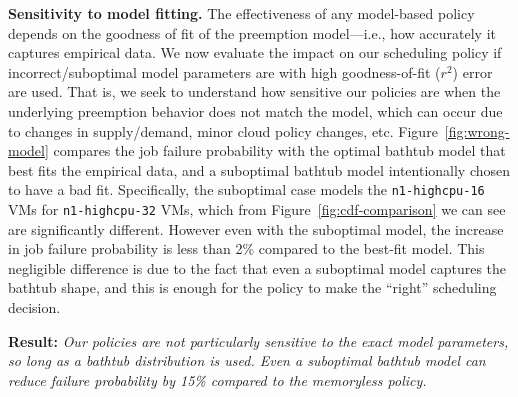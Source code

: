 



\noindent \textbf{Sensitivity to model fitting.}
The effectiveness of any model-based policy depends on the goodness of fit of the preemption model---i.e., how accurately it captures empirical data. 
%
We now evaluate the impact on our scheduling policy if incorrect/suboptimal model parameters are with high goodness-of-fit ($r^2$) error are used. 
%
That is, we seek to understand how sensitive our policies are when the underlying preemption behavior does not match the model, which can occur due to changes in supply/demand, minor cloud policy changes, etc. 
%
Figure~\ref{fig:wrong-model} compares the job failure probability with the optimal bathtub model that best fits the empirical data, and a suboptimal  bathtub model intentionally chosen to have a bad fit. 
%
Specifically, the suboptimal case models the \texttt{n1-highcpu-16} VMs for \texttt{n1-highcpu-32} VMs, which from Figure~\ref{fig:cdf-comparison} we can see are significantly different.
%
However even with the suboptimal model, the increase in job failure probability is less than 2\% compared to the best-fit model. 
%
This negligible difference is due to the fact that even a suboptimal model captures the bathtub shape, and this is enough for the policy to make the ``right'' scheduling decision. 

\noindent \textbf{Result:} \emph{Our policies are not particularly sensitive to the exact model parameters, so long as a bathtub distribution is used. Even a suboptimal bathtub model can reduce failure probability by 15\% compared to the memoryless policy.} 
%



    

\vspace*{\subsecspace}
